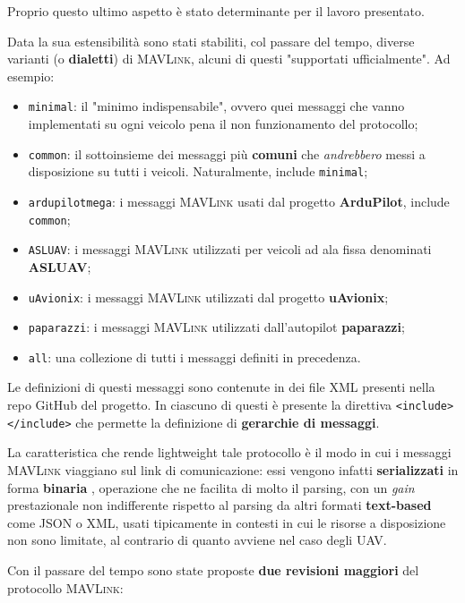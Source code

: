 \documentclass[a4paper, 12pt, oneside]{article}
\theoremstyle{definition}
\begin{document}
Proprio questo ultimo aspetto è stato determinante per il lavoro presentato.

Data la sua estensibilità sono stati stabiliti, col passare del tempo, diverse varianti (o \textbf{dialetti}) di \textsc{MAVLink}, alcuni di questi "supportati ufficialmente". Ad esempio:

\begin{itemize}
    \item \texttt{minimal}: il "minimo indispensabile", ovvero quei messaggi che vanno implementati su ogni veicolo pena il non funzionamento del protocollo;
    \item \texttt{common}: il sottoinsieme dei messaggi più \textbf{comuni} che \textit{andrebbero} messi a disposizione su tutti i veicoli. Naturalmente, include \texttt{minimal};
    \item \texttt{ardupilotmega}: i messaggi \textsc{MAVLink} usati dal progetto \textbf{ArduPilot}, include \texttt{common};
    \item \texttt{ASLUAV}: i messaggi \textsc{MAVLink} utilizzati per veicoli ad ala fissa denominati \textbf{ASLUAV};
    \item \texttt{uAvionix}: i messaggi \textsc{MAVLink} utilizzati dal progetto \textbf{uAvionix};
    \item \texttt{paparazzi}: i messaggi \textsc{MAVLink} utilizzati dall'autopilot \textbf{paparazzi};
    \item \texttt{all}: una collezione di tutti i messaggi definiti in precedenza.
\end{itemize}

Le definizioni di questi messaggi sono contenute in dei file XML presenti nella repo GitHub del progetto. In ciascuno di questi è presente la direttiva \texttt{<include></include>} che permette la definizione di \textbf{gerarchie di messaggi}. \cite{mavlink-message-definitions}

La caratteristica che rende lightweight tale protocollo è il modo in cui i messaggi \textsc{MAVLink} viaggiano sul link di comunicazione: essi vengono infatti \textbf{serializzati} in forma \textbf{binaria} \cite{mavlink-overview}, operazione che ne facilita di molto il parsing, con un \textit{gain} prestazionale non indifferente rispetto al parsing da altri formati \textbf{text-based} come JSON o XML, usati tipicamente in contesti in cui le risorse a disposizione non sono limitate, al contrario di quanto avviene nel caso degli UAV.

Con il passare del tempo sono state proposte \textbf{due revisioni maggiori} del protocollo \textsc{MAVLink}:
\end{document}
